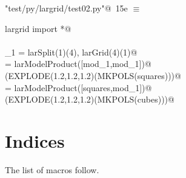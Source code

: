 \documentclass[11pt,oneside]{article}	%
\begin{document}
\begin{flushleft} \small \label{scrap27}
\protect{}\verb@"test/py/largrid/test02.py"@\nobreak\ {\footnotesize 15e }$\equiv$
\vspace{-1ex}
\begin{list}{}{} \item
\mbox{}\verb@from largrid import *@\\
\mbox{}\verb@@\\
\mbox{}\verb@mod_1 = larSplit(1)(4), larGrid(4)(1)@\\
\mbox{}\verb@squares = larModelProduct([mod_1,mod_1])@\\
\mbox{}\verb@VIEW(EXPLODE(1.2,1.2,1.2)(MKPOLS(squares)))@\\
\mbox{}\verb@cubes = larModelProduct([squares,mod_1])@\\
\mbox{}\verb@VIEW(EXPLODE(1.2,1.2,1.2)(MKPOLS(cubes)))@\\
\mbox{}\verb@@{\NWsep}
\end{list}
\vspace{-2ex}
\end{flushleft}


\section{Indices}
\label{sec:indices}

The list of macros follow.
\end{document}
